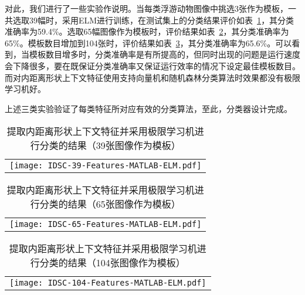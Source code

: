 对此，我们进行了一些实验作说明。当每类浮游动物图像中挑选3张作为模板，一共选取39幅时，采用ELM进行训练，在测试集上的分类结果评价如表~\ref{IDSC-39-Features-MATLAB-ELM}，其分类准确率为59.4\%。选取65幅图像作为模板时，评价结果如表~\ref{IDSC-65-Features-MATLAB-ELM}，其分类准确率为65\%。模板数目增加到104张时，评价结果如表~\ref{IDSC-104-Features-MATLAB-ELM}，其分类准确率为65.6\%。可以看到，当模板数目增多时，分类准确率是有所提高的，但同时出现的问题是运行速度会下降很多，要在既保证分类准确率又保证运行效率的情况下设定最佳模板数目。而对内距离形状上下文特征使用支持向量机和随机森林分类算法时效果都没有极限学习机好。

上述三类实验验证了每类特征所对应有效的分类算法，至此，分类器设计完成。

\begin{table}
\centering
\caption{提取内距离形状上下文特征并采用极限学习机进行分类的结果（39张图像作为模板）}
\begin{tabular}{c}
\texttt{[image: IDSC-39-Features-MATLAB-ELM.pdf]}
\end{tabular}
\label{IDSC-39-Features-MATLAB-ELM}
\end{table}

\begin{table}
\centering
\caption{提取内距离形状上下文特征并采用极限学习机进行分类的结果（65张图像作为模板）}
\begin{tabular}{c}
\texttt{[image: IDSC-65-Features-MATLAB-ELM.pdf]}
\end{tabular}
\label{IDSC-65-Features-MATLAB-ELM}
\end{table}

\begin{table}
\centering
\caption{提取内距离形状上下文特征并采用极限学习机进行分类的结果（104张图像作为模板）}
\begin{tabular}{c}
\texttt{[image: IDSC-104-Features-MATLAB-ELM.pdf]}
\end{tabular}
\label{IDSC-104-Features-MATLAB-ELM}
\end{table}

